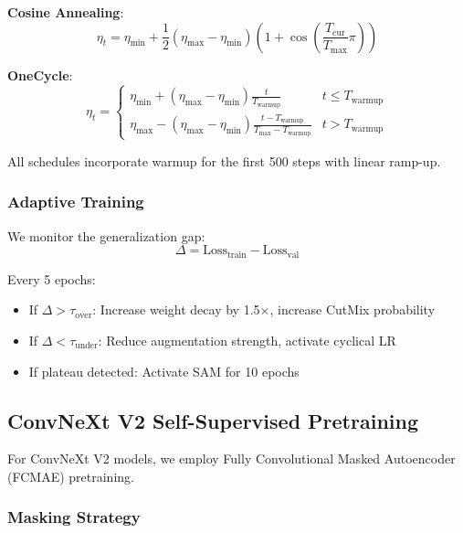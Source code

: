 \textbf{Cosine Annealing}:
\begin{equation}
\eta_t = \eta_{\min} + \frac{1}{2}(\eta_{\max} - \eta_{\min})\left(1 + \cos\left(\frac{T_{\text{cur}}}{T_{\max}}\pi\right)\right)
\end{equation}

\textbf{OneCycle}:
\begin{equation}
\eta_t = \begin{cases}
\eta_{\min} + (\eta_{\max} - \eta_{\min})\frac{t}{T_{\text{warmup}}} & t \leq T_{\text{warmup}} \\
\eta_{\max} - (\eta_{\max} - \eta_{\min})\frac{t - T_{\text{warmup}}}{T_{\max} - T_{\text{warmup}}} & t > T_{\text{warmup}}
\end{cases}
\end{equation}

All schedules incorporate warmup for the first 500 steps with linear ramp-up.

\subsubsection{Adaptive Training}

We monitor the generalization gap:
\begin{equation}
\Delta = \text{Loss}_{\text{train}} - \text{Loss}_{\text{val}}
\end{equation}

Every 5 epochs:
\begin{itemize}
    \item If $\Delta > \tau_{\text{over}}$: Increase weight decay by 1.5×, increase CutMix probability
    \item If $\Delta < \tau_{\text{under}}$: Reduce augmentation strength, activate cyclical LR
    \item If plateau detected: Activate SAM for 10 epochs
\end{itemize}

\subsection{ConvNeXt V2 Self-Supervised Pretraining}

For ConvNeXt V2 models, we employ Fully Convolutional Masked Autoencoder (FCMAE) pretraining.

\subsubsection{Masking Strategy}

